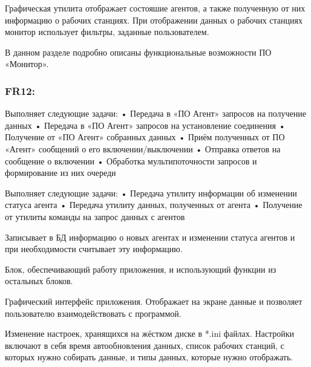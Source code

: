 Графическая утилита отображает состояшие агентов, а также полученную от них информацию о рабочих станциях.  При отображении данных о рабочих станциях монитор использует фильтры, заданные пользователем. 

В данном разделе подробно описаны функциональные возможности ПО  «Монитор».

\subsubsection{FR12:}


Выполняет следующие задачи:
•	Передача в «ПО Агент» запросов на получение данных
•	Передача в «ПО Агент» запросов на установление соединения
•	Получение от «ПО Агент» собранных данных
•	Приём полученных от ПО «Агент» сообщений о его включении/выключении 
•	Отправка ответов на сообщение о включении
•	Обработка мультипоточности запросов и формирование из них очереди


Выполняет следующие задачи:
•	Передача утилиту информации об изменении статуса агента
•	Передача утилиту данных, полученных от агента
•	Получение от утилиты команды на запрос данных с агентов


Записывает в БД информацию о новых агентах и изменении статуса агентов и при необходимости считывает эту информацию.

Блок, обеспечивающий работу приложения, и использующий функции из остальных блоков.

Графический интерфейс приложения. Отображает на экране данные и позволяет пользователю взаимодействовать с программой.

Изменение настроек, хранящихся на жёстком диске в *.ini файлах. Настройки включают в себя время автообновления данных, список рабочих станций, с которых нужно собирать данные, и типы данных, которые нужно отображать.


